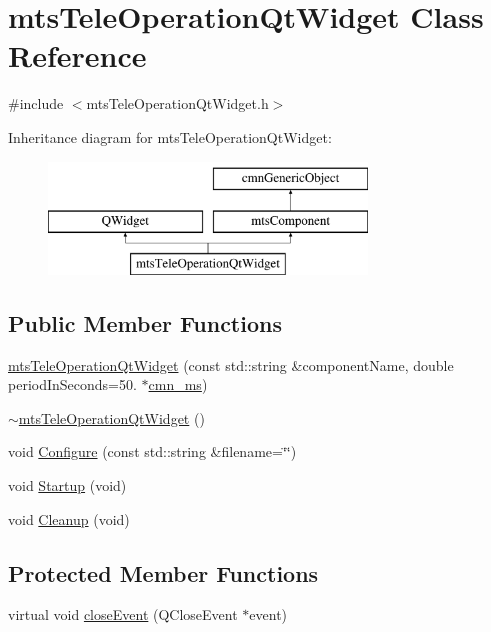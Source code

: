 \hypertarget{classmts_tele_operation_qt_widget}{}\section{mts\+Tele\+Operation\+Qt\+Widget Class Reference}
\label{classmts_tele_operation_qt_widget}


{\ttfamily \#include $<$mts\+Tele\+Operation\+Qt\+Widget.\+h$>$}

Inheritance diagram for mts\+Tele\+Operation\+Qt\+Widget\+:\begin{figure}[H]
\begin{center}
\leavevmode
\includegraphics[height=3.000000cm]{dc/d7b/classmts_tele_operation_qt_widget}
\end{center}
\end{figure}
\subsection*{Public Member Functions}
\begin{DoxyCompactItemize}
\item 
\hyperlink{classmts_tele_operation_qt_widget_a332a9b14cae2e0d3effbfb6e7f89d8fa}{mts\+Tele\+Operation\+Qt\+Widget} (const std\+::string \&component\+Name, double period\+In\+Seconds=50. $\ast$\hyperlink{cmn_units_8h_aaf4d3f2fafb9b4a95606544b9d876b4a}{cmn\+\_\+ms})
\item 
\hyperlink{classmts_tele_operation_qt_widget_af1bb55aa6e057770327bb843491bda8a}{$\sim$mts\+Tele\+Operation\+Qt\+Widget} ()
\item 
void \hyperlink{classmts_tele_operation_qt_widget_abe6f07d439d8b5895da83326a8d6bcf9}{Configure} (const std\+::string \&filename=\char`\"{}\char`\"{})
\item 
void \hyperlink{classmts_tele_operation_qt_widget_a4e5a6ed4858b14d12d6ef7fa3354b1c5}{Startup} (void)
\item 
void \hyperlink{classmts_tele_operation_qt_widget_a9ad149686193c3027e1448082296704a}{Cleanup} (void)
\end{DoxyCompactItemize}
\subsection*{Protected Member Functions}
\begin{DoxyCompactItemize}
\item 
virtual void \hyperlink{classmts_tele_operation_qt_widget_a52c78e296d8af55262774a272aaa07c5}{close\+Event} (Q\+Close\+Event $\ast$event)
\end{DoxyCompactItemize}
